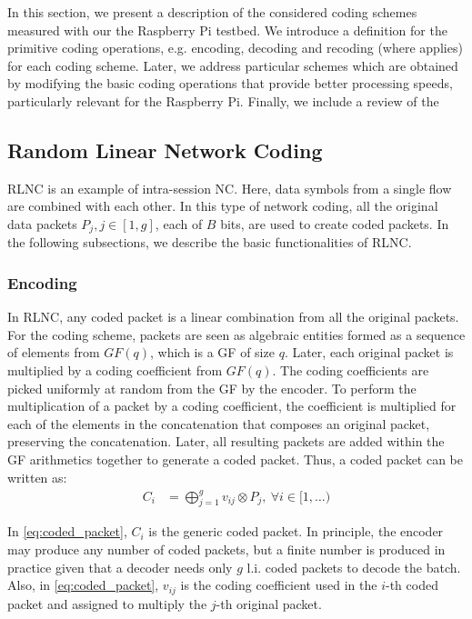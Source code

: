 \label{sec:schemes}

In this section, we present a description of the considered coding schemes
measured with our the Raspberry Pi testbed. We introduce a definition
for the primitive coding operations, e.g. encoding, decoding and recoding
(where applies) for each coding scheme. Later, we address particular schemes
which are obtained by modifying the basic coding operations that provide
better processing speeds, particularly relevant for the Raspberry Pi.
Finally, we include a review of the

\subsection{Random Linear Network Coding}
\label{ssec:RLNC}

\ac{RLNC} is an example of intra-session \ac{NC}. Here, data symbols from a
single flow are combined with each other. In this type of network coding,
all the original data packets $P_j, j \in [1,g]$, each of $B$ bits, are used
to create coded packets. In the following subsections, we describe the
basic functionalities of \ac{RLNC}.

\subsubsection{Encoding}
In \ac{RLNC}, any coded packet is a linear combination from all
the original packets. For the coding scheme, packets are seen as
algebraic entities formed as a sequence of elements from $GF(q)$,
which is a \ac{GF} of size $q$. Later, each original packet is
multiplied by a coding coefficient from $GF(q)$. The coding coefficients
are picked uniformly at random from the \ac{GF} by the encoder. To
perform the multiplication of a packet by a coding coefficient, the
coefficient is multiplied for each of the elements in the
concatenation that composes an original packet, preserving the
concatenation. Later, all resulting packets are added within the
\ac{GF} arithmetics together to generate a coded packet. Thus, a
coded packet can be written as:
%
\begin{align} \label{eq:coded_packet}
C_i  &= \bigoplus_{j=1}^{g} v_{ij} \otimes P_j ,\ \forall i \in [1,\ldots)
\end{align}

In \eqref{eq:coded_packet}, $C_i$ is the generic coded packet. In principle,
the encoder may produce any number of coded packets, but a finite
number is produced in practice given that a decoder needs only
$g$ \ac{l.i.} coded packets to decode the batch. Also, in
\eqref{eq:coded_packet}, $v_{ij}$ is the coding coefficient used in the
$i$-th coded packet and assigned to multiply the $j$-th original packet.

